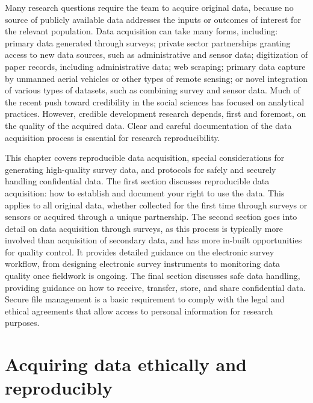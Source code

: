 
\begin{fullwidth}
Many research questions require the team to acquire original data,
because no source of publicly available data addresses the
inputs or outcomes of interest for the relevant population.
Data acquisition can take many forms, including:
primary data generated through surveys;
private sector partnerships granting access to new data sources, such as administrative and sensor data;
digitization of paper records, including administrative data; web scraping;
primary data capture by unmanned aerial vehicles or other types of remote sensing;
or novel integration of various types of datasets, such as combining survey and sensor data.
Much of the recent push toward credibility in the social sciences has focused on analytical practices.
However, credible development research depends, first and foremost, on the quality of the acquired data.
Clear and careful documentation of the data acquisition process is essential for research reproducibility.

This chapter covers reproducible data acquisition,
special considerations for generating high-quality survey data,
and protocols for safely and securely handling confidential data.
The first section discusses reproducible data acquisition:
how to establish and document your right to use the data.
This applies to all original data,
whether collected for the first time through surveys or sensors or acquired through a unique partnership.
The second section goes into detail on data acquisition through surveys,
as this process is typically more involved than acquisition of secondary data,
and has more in-built opportunities for quality control.
It provides detailed guidance on the electronic survey workflow,
from designing electronic survey instruments to monitoring data quality once fieldwork is ongoing.
The final section discusses safe data handling,
providing guidance on how to receive, transfer, store, and share confidential data.
Secure file management is a basic requirement to comply with the legal and
ethical agreements that allow  access to personal information for research purposes.


\end{fullwidth}

\section{Acquiring data ethically and reproducibly}

